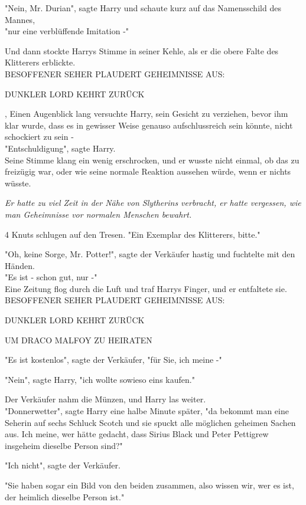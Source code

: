 {"Nein, Mr. Durian", sagte Harry und schaute kurz auf das Namensschild des Mannes,\\ "nur eine verblüffende Imitation -"

Und dann stockte Harrys Stimme in seiner Kehle, als er die obere Falte des Klitterers erblickte.\\

BESOFFENER SEHER PLAUDERT GEHEIMNISSE AUS:

DUNKLER LORD KEHRT ZURÜCK

, Einen Augenblick lang versuchte Harry, sein Gesicht zu verziehen, bevor ihm klar wurde, dass es in gewisser Weise genauso aufschlussreich sein könnte, nicht schockiert zu sein -\\ "Entschuldigung", sagte Harry.\\ Seine Stimme klang ein wenig erschrocken, und er wusste nicht einmal, ob das zu freizügig war, oder wie seine normale Reaktion aussehen würde, wenn er nichts wüsste.

\emph{Er hatte zu viel Zeit in der Nähe von Slytherins verbracht, er hatte vergessen, wie man Geheimnisse vor normalen Menschen bewahrt.}

4 Knuts schlugen auf den Tresen. "Ein Exemplar des Klitterers, bitte."

"Oh, keine Sorge, Mr. Potter!", sagte der Verkäufer hastig und fuchtelte mit den Händen.\\ "Es ist - schon gut, nur -"\\ Eine Zeitung flog durch die Luft und traf Harrys Finger, und er entfaltete sie.\\

BESOFFENER SEHER PLAUDERT GEHEIMNISSE AUS:

DUNKLER LORD KEHRT ZURÜCK

UM DRACO MALFOY ZU HEIRATEN

"Es ist kostenlos", sagte der Verkäufer, "für Sie, ich meine -"

"Nein", sagte Harry, "ich wollte sowieso eins kaufen."

Der Verkäufer nahm die Münzen, und Harry las weiter.\\ "Donnerwetter", sagte Harry eine halbe Minute später, "da bekommt man eine Seherin auf sechs Schluck Scotch und sie spuckt alle möglichen geheimen Sachen aus. Ich meine, wer hätte gedacht, dass Sirius Black und Peter Pettigrew insgeheim dieselbe Person sind?"

"Ich nicht", sagte der Verkäufer.

"Sie haben sogar ein Bild von den beiden zusammen, also wissen wir, wer es ist, der heimlich dieselbe Person ist."

}
